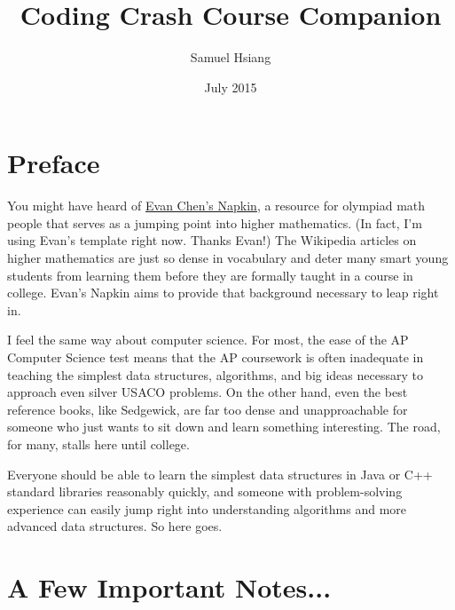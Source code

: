 \documentclass[11pt]{book}
\title{Coding Crash Course Companion}
\author{Samuel Hsiang}
\date{July 2015}
\begin{document}
\maketitle

\thispagestyle{empty}
\par\vspace*{.35\textheight}{\centering Some cheesy dedication thing to fill out once I'm done. \par}

\tableofcontents

\eject

\section*{Preface}

You might have heard of \href{https://www.dropbox.com/s/z8qdndxmrmxqsam/Napkin.pdf?oref=e&n=97419869}{Evan Chen's Napkin}, a resource for olympiad math people that serves as a jumping point into higher mathematics. (In fact, I'm using Evan's template right now. Thanks Evan!) The Wikipedia articles on higher mathematics are just so dense in vocabulary and deter many smart young students from learning them before they are formally taught in a course in college. Evan's Napkin aims to provide that background necessary to leap right in.

I feel the same way about computer science. For most, the ease of the AP Computer Science test means that the AP coursework is often inadequate in teaching the simplest data structures, algorithms, and big ideas necessary to approach even silver USACO problems. On the other hand, even the best reference books, like Sedgewick, are far too dense and unapproachable for someone who just wants to sit down and learn something interesting. The road, for many, stalls here until college.

Everyone should be able to learn the simplest data structures in Java or C++ standard libraries reasonably quickly, and someone with problem-solving experience can easily jump right into understanding algorithms and more advanced data structures. So here goes.

\section*{A Few Important Notes...}
\end{document}
